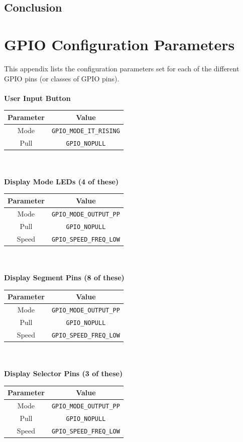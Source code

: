 \documentclass[12pt]{report}
\begin{document}
\section{Conclusion}
\newpage
\begin{appendix}\label{appendices}
	\chapter{GPIO Configuration Parameters}\label{appendixgpio}
	This appendix lists the configuration parameters set for each of the different GPIO pins (or
	classes of GPIO pins).\\\\
	\textbf{User Input Button}\\
	\begin{tabular}{|c|c|}
		\hline
		Parameter & Value\\\hline
		Mode & \texttt{GPIO\_MODE\_IT\_RISING}\\\hline
		Pull & \texttt{GPIO\_NOPULL}\\\hline
	\end{tabular}
	\newline
	\\\\
	\textbf{Display Mode LEDs (4 of these)}\\
	\begin{tabular}{|c|c|}
		\hline
		Parameter & Value\\\hline
		Mode & \texttt{GPIO\_MODE\_OUTPUT\_PP}\\\hline
		Pull & \texttt{GPIO\_NOPULL}\\\hline
		Speed & \texttt{GPIO\_SPEED\_FREQ\_LOW}\\\hline
	\end{tabular}
	\newline
	\\\\
	\textbf{Display Segment Pins (8 of these)}\\
	\begin{tabular}{|c|c|}
		\hline
		Parameter & Value\\\hline
		Mode & \texttt{GPIO\_MODE\_OUTPUT\_PP}\\\hline
		Pull & \texttt{GPIO\_NOPULL}\\\hline
		Speed & \texttt{GPIO\_SPEED\_FREQ\_LOW}\\\hline
	\end{tabular}
	\newline
	\\\\
	\textbf{Display Selector Pins (3 of these)}\\
	\begin{tabular}{|c|c|}
		\hline
		Parameter & Value\\\hline
		Mode & \texttt{GPIO\_MODE\_OUTPUT\_PP}\\\hline
		Pull & \texttt{GPIO\_NOPULL}\\\hline
		Speed & \texttt{GPIO\_SPEED\_FREQ\_LOW}\\\hline
	\end{tabular}
	\newline
	\newpage

\end{appendix}
\end{document}
